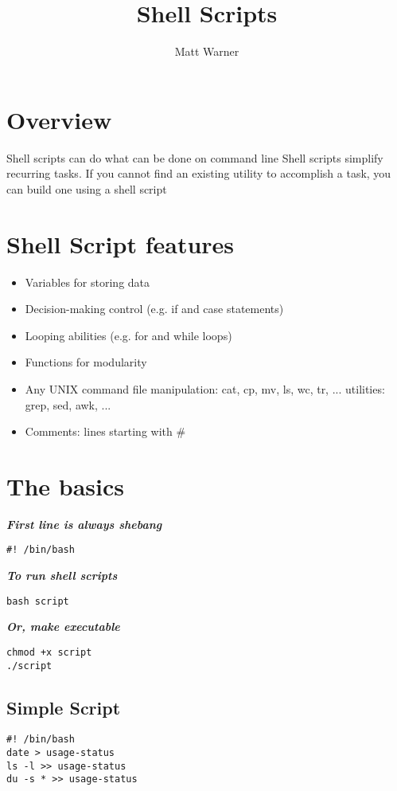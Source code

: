 \documentclass{report}
\title{\Huge{Shell Scripts}}
\author{\huge{Matt Warner}}
\date{\huge{}}
\begin{document}
  \maketitle
\tableofcontents
\newpage
  \section{Overview}
Shell scripts can do what can be done on command line
\bigbreak \noindent
Shell scripts simplify recurring tasks. If you cannot find an existing utility to accomplish a task, you can build one using a shell script
\section{Shell Script features}
\begin{itemize}
  \item Variables for storing data 
\item Decision-making control (e.g. if and case statements)
\item Looping abilities (e.g. for and while loops)
\item Functions for modularity
\item Any UNIX command
  \subitem file manipulation: cat, cp, mv, ls, wc, tr, ...
  \subitem utilities: grep, sed, awk, ...
\item Comments: lines starting with \#
\end{itemize}
\section{The basics}
\textit{\textbf{First line is always shebang}}
\begin{verbatim}
#! /bin/bash
\end{verbatim}
\textit{\textbf{To run shell scripts}}
\begin{verbatim}
bash script
\end{verbatim}
\textit{\textbf{Or, make executable}}
\begin{verbatim}
chmod +x script
./script
\end{verbatim}
\subsection{Simple Script}
\begin{mdframed}
\begin{verbatim}
#! /bin/bash
date > usage-status
ls -l >> usage-status
du -s * >> usage-status
\end{verbatim}
\end{mdframed}
\end{document}
